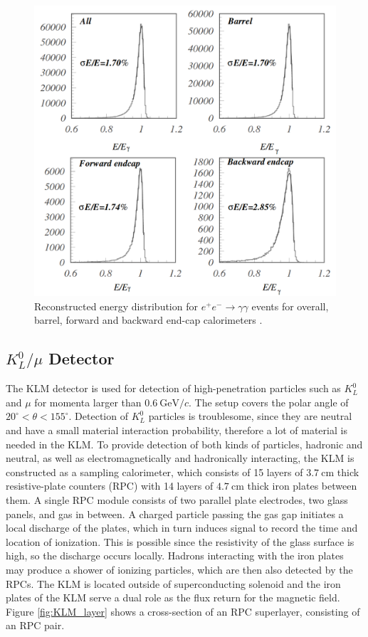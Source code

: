 \documentclass[headings=standardclasses,headings=big,oneside,a4paper,openany,12pt]{scrbook}
\newcommand {\e}[1]{\mathrm{~#1}}
\begin{document}
\begin{figure}[H]
	\centering
	\captionsetup{width=0.8\linewidth}
	\includegraphics[width=0.8\linewidth]{fig/setup/ECL_resolution}
	\caption{Reconstructed energy distribution for $e^+e^- \to \gamma\gamma$ events for overall, barrel, forward and backward end-cap calorimeters \cite{ABASHIAN2002117}.}
	\label{fig:ECL_resolution}
\end{figure}

\subsection{$K_L^0/\mu$ Detector}
The KLM detector is used for detection of high-penetration particles such as $K_L^0$ and $\mu$ for momenta larger than $0.6\e{GeV}/c$. The setup covers the polar angle of $20^\circ < \theta < 155^\circ$. Detection of $K_L^0$ particles is troublesome, since they are neutral and have a small material interaction probability, therefore a lot of material is needed in the KLM. To provide detection of both kinds of particles, hadronic and neutral, as well as electromagnetically and hadronically interacting, the KLM is constructed as a sampling calorimeter, which consists of 15 layers of $3.7\e{cm}$ thick resistive-plate counters (RPC) with 14 layers of $4.7\e{cm}$ thick iron plates between them. A single RPC module consists of two parallel plate electrodes, two glass panels, and gas in between. A charged particle passing the gas gap initiates a local discharge of the plates, which in turn induces signal to record the time and location of ionization. This is possible since the resistivity of the glass surface is high, so the discharge occurs locally. Hadrons interacting with the iron plates may produce a shower of ionizing particles, which are then also detected by the RPCs. The KLM is located outside of superconducting solenoid and the iron plates of the KLM serve a dual role as the flux return for the magnetic field. Figure \ref{fig:KLM_layer} shows a cross-section of an RPC superlayer, consisting of an RPC pair.
\end{document}
